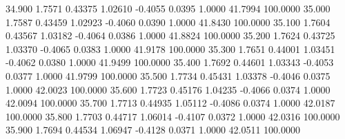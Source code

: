   34.900   1.7571   0.43375   1.02610  -0.4055   0.0395   1.0000  41.7994 100.0000
  35.000   1.7587   0.43459   1.02923  -0.4060   0.0390   1.0000  41.8430 100.0000
  35.100   1.7604   0.43567   1.03182  -0.4064   0.0386   1.0000  41.8824 100.0000
  35.200   1.7624   0.43725   1.03370  -0.4065   0.0383   1.0000  41.9178 100.0000
  35.300   1.7651   0.44001   1.03451  -0.4062   0.0380   1.0000  41.9499 100.0000
  35.400   1.7692   0.44601   1.03343  -0.4053   0.0377   1.0000  41.9799 100.0000
  35.500   1.7734   0.45431   1.03378  -0.4046   0.0375   1.0000  42.0023 100.0000
  35.600   1.7723   0.45176   1.04235  -0.4066   0.0374   1.0000  42.0094 100.0000
  35.700   1.7713   0.44935   1.05112  -0.4086   0.0374   1.0000  42.0187 100.0000
  35.800   1.7703   0.44717   1.06014  -0.4107   0.0372   1.0000  42.0316 100.0000
  35.900   1.7694   0.44534   1.06947  -0.4128   0.0371   1.0000  42.0511 100.0000
